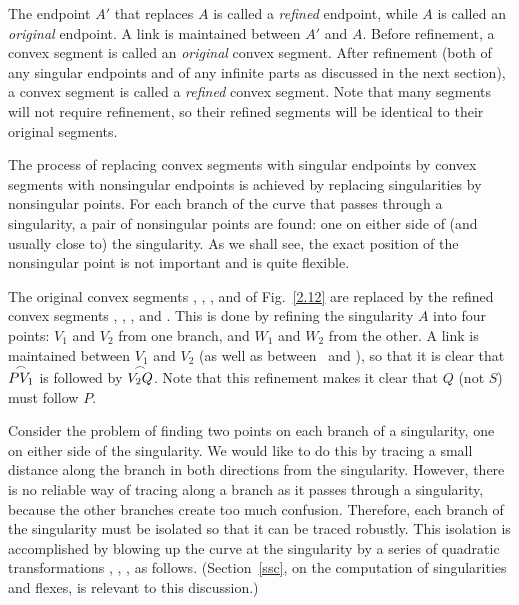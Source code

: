 The endpoint $A'$ that replaces $A$ is called a {\em refined} endpoint,
while $A$ is called an {\em original} endpoint.
A link is maintained between $A'$ and $A$.
Before refinement, a convex segment is called an {\em original} convex segment.
After refinement (both of any singular endpoints and of any infinite parts as discussed in 
the next section), a convex segment is called a {\em refined} convex segment.
Note that many segments will not require refinement, so their refined segments
will be identical to their original segments.

The process of replacing convex segments with singular endpoints
by convex segments with nonsingular endpoints 
is achieved by replacing singularities by nonsingular points.
For each branch of the curve that passes through a singularity, 
a pair of nonsingular points are found: one on either side of (and usually close to) 
the singularity.
As we shall see, the exact position of the nonsingular point is not important and
is quite flexible.


\begin{example}
\label{eg-pseudo}
\rm{
The original convex segments , , , and 
of Fig.~\ref{2.12} are replaced by the refined convex segments
, , , and .
This is done by refining the singularity $A$ into four points:
$V_{1}$ and $V_{2}$ from one branch, and $W_{1}$ and $W_{2}$ from the other.
A link is maintained between $V_{1}$ and $V_{2}$ (as well as between \wo\ and \wt),
so that it is clear that $\mbox{$\stackrel{\frown}{PV_{1}}$}$ is followed by $\mbox{$\stackrel{\frown}{V_{2}Q}$}$.
Note that this refinement makes it clear that $Q$ (not $S$) must follow $P$.
}
\end{example}

Consider the problem of finding two points on each branch of a singularity, one on either 
side of the singularity.
We would like to do this by tracing \cite{bhhl} a small distance along the branch
in both directions from the singularity.
However, there is no reliable way of tracing along a branch as it passes
through a singularity, because the other branches create too much confusion.
Therefore, each branch of the singularity must be isolated so that it can 
be traced robustly.
This isolation is accomplished by blowing up the curve at the singularity by 
a series of quadratic transformations \cite{bhhl}, \cite{walker}, \cite{abhy}, as follows.
(Section~\ref{ssc}, on the computation
of singularities and flexes, is relevant to this discussion.)

